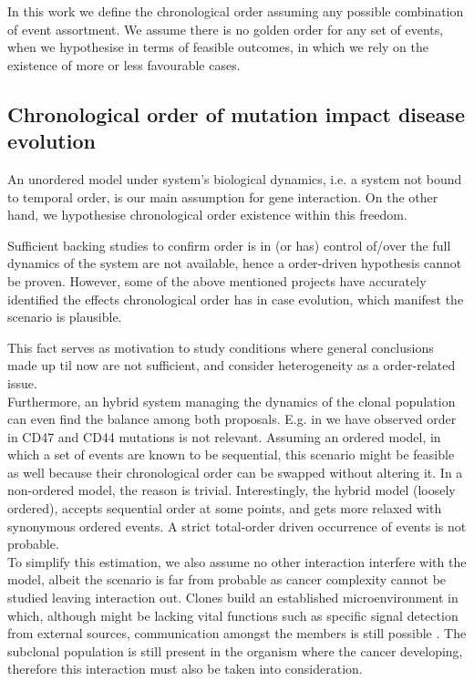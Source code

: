 In this work we define the chronological order assuming any possible combination of event assortment. We assume there is no golden order for any set of events, when we hypothesise in terms of feasible outcomes, in which we rely on the existence of more or less favourable cases.
\\
\subsection{Chronological order of mutation impact disease evolution}

An unordered model under system's biological dynamics, i.e. a system not bound to temporal order, is our main assumption for gene interaction. On the other hand, we hypothesise chronological order existence within this freedom.

Sufficient backing studies to confirm order is in (or has) control of/over the full dynamics of the system are not available, hence a order-driven hypothesis cannot be proven. However, some of the above mentioned projects have accurately identified the effects chronological order has in case evolution, which manifest the scenario is plausible. 

This fact serves as motivation to study conditions where general conclusions made up til now are not sufficient, and consider heterogeneity as a order-related issue.
\\

Furthermore, an hybrid system managing the dynamics of the clonal population can even find the balance among both proposals. E.g. in \cite{Ascolani2019ModelingMatter} we have observed order in CD47 and CD44 mutations is not relevant. Assuming an ordered model, in which a set of events are known to be sequential, this scenario might be feasible as well because their chronological order can be swapped without altering it. In a non-ordered model, the reason is trivial. Interestingly, the hybrid model (loosely ordered), accepts sequential order at some points, and gets more relaxed with synonymous ordered events. A strict total-order driven occurrence of events is not probable.
\\

To simplify this estimation, we also assume no other interaction interfere with the model, albeit the scenario is far from probable as cancer complexity cannot be studied leaving interaction out. Clones build an established microenvironment in which, although might be lacking vital functions such as specific signal detection from external sources, communication amongst the members is still possible \cite{Chiodoni2019Correction10.1186/s13046-019-1122-2}. The subclonal population is still present in the organism where the cancer developing, therefore this interaction must also be taken into consideration.
\\

